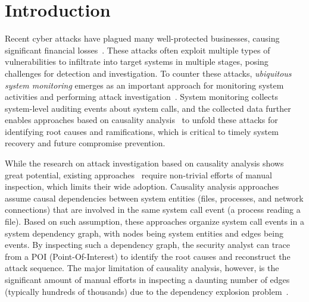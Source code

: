 \section{Introduction}


Recent cyber attacks have plagued many well-protected businesses, causing significant 
financial losses~\cite{ebay,opm,target,homedepot,ya:yahooleak,equifax,marriott}.
These attacks often exploit multiple types of vulnerabilities to infiltrate into target systems in multiple stages, posing challenges for detection and investigation.
To counter these 
attacks, \emph{ubiquitous system monitoring} emerges as an important approach for monitoring system activities and performing attack investigation~\cite{backtracking,backtracking2,wormlog,logtracking,mcitracking,liu2018priotracker,hassan2019nodoze,gao2018aiql,gao2018saql}.
System monitoring collects system-level auditing events about system calls,
and the collected data further enables approaches based on causality analysis~\cite{backtracking,backtracking2,taser,intrusionrecovery,liu2018priotracker}  
to unfold these attacks for identifying root causes and ramifications,
which is critical to timely system recovery and future compromise prevention.

While the research on attack investigation based on causality analysis shows great potential, 
existing approaches~\cite{backtracking,backtracking2,taser,intrusionrecovery,liu2018priotracker} require non-trivial efforts of manual inspection, which limits their wide adoption.
%
Causality analysis approaches assume causal dependencies between system entities (\eg files, processes, and network connections) that are involved in the same system call event (\eg a process reading a file).
Based on such assumption, these approaches organize system call events in a system dependency graph, with nodes being system entities and edges being events.
By inspecting such a dependency graph, the security analyst can trace from a POI (Point-Of-Interest) to identify the root causes and reconstruct the attack sequence.
The major limitation of causality analysis, however, is the significant amount of manual efforts in inspecting a daunting number of edges (typically hundreds of thousands) due to the dependency explosion problem~\cite{beep,reduction,reduction2}.

